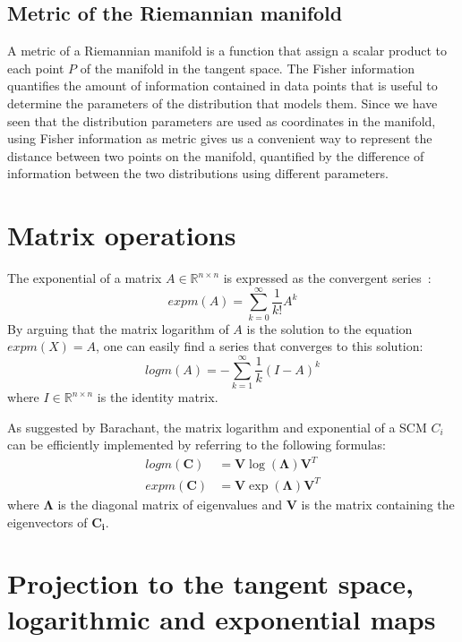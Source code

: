\documentclass[a4paper,11pt]{report}
\begin{document}
\subsection{Metric of the Riemannian manifold}
A metric of a Riemannian manifold is a function that assign a scalar product to each point $P$ of the manifold in the tangent space. 
The Fisher information quantifies the amount of information contained in data points that is useful to determine the parameters of 
the distribution that models them.
Since we have seen that the distribution parameters are used as coordinates in the manifold, using Fisher information as metric gives us a convenient way to represent the distance between two points on the manifold, quantified by the difference of information between the two distributions using different parameters.

\section{Matrix operations}

The exponential of a matrix $A \in \mathbb{R}^{n \times n}$ is expressed as the convergent series~\citep{doi:10.1137/S0895479803436937}:
\begin{equation}
  expm(A) = \sum\limits_{k=0}^{\infty} \frac{1}{k!} A^k
\end{equation}
By arguing that the matrix logarithm of $A$ is the solution to the equation $expm(X) = A$, one can easily find a series that converges to this solution:
\begin{equation}
  logm(A) = - \sum\limits_{k=1}^{\infty} \frac{1}{k} (I - A)^k
\end{equation}
\noindent where $I \in \mathbb{R}^{n \times n}$ is the identity matrix.

As suggested by Barachant, the matrix logarithm and exponential of a SCM $C_i$ can be efficiently implemented by referring to the following formulas:
\begin{align}
  logm(\mathbf{C}) & = \mathbf{V} \log{(\mathbf{\Lambda})} \mathbf{V}^T \\
  expm(\mathbf{C}) & = \mathbf{V} \exp{(\mathbf{\Lambda})} \mathbf{V}^T
\end{align}
\noindent where $\mathbf{\Lambda}$ is the diagonal matrix of eigenvalues
and $\mathbf{V}$ is the matrix containing the eigenvectors of $\mathbf{C_i}$.

\section{Projection to the tangent space, logarithmic and exponential maps}
\end{document}
